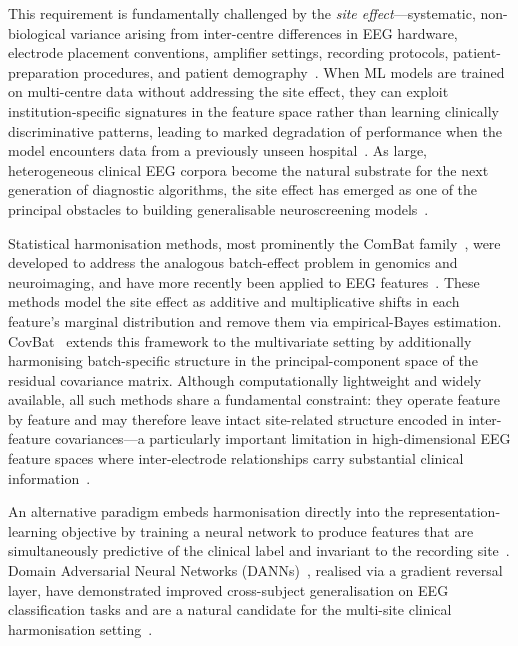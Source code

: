 \documentclass[preprint,12pt]{elsarticle}
\begin{document}
This requirement is fundamentally challenged by the \emph{site
effect}---systematic, non-biological variance arising from
inter-centre differences in EEG hardware, electrode placement
conventions, amplifier settings, recording protocols, patient-
preparation procedures, and patient
demography~\cite{jaramillo2024combat,li2022harmnqeeg}.
When ML models are trained on multi-centre data without addressing
the site effect, they can exploit institution-specific signatures in
the feature space rather than learning clinically discriminative
patterns, leading to marked degradation of performance when the model
encounters data from a previously unseen
hospital~\cite{kiessner2023extended,mellot2023meeg}.
As large, heterogeneous clinical EEG corpora become the natural
substrate for the next generation of diagnostic algorithms, the site
effect has emerged as one of the principal obstacles to building
generalisable neuroscreening models~\cite{dong2025normative,
mushtaq2025eeg}.

Statistical harmonisation methods, most prominently the ComBat
family~\cite{johnson2007adjusting,fortin2017harmonization,
fortin2018cortical}, were developed to address the analogous
batch-effect problem in genomics and neuroimaging, and have more
recently been applied to EEG
features~\cite{jaramillo2024combat,li2022harmnqeeg}.
These methods model the site effect as additive and multiplicative
shifts in each feature's marginal distribution and remove them via
empirical-Bayes estimation.
CovBat~\cite{hu2023image} extends this framework to the multivariate
setting by additionally harmonising batch-specific structure in the
principal-component space of the residual covariance matrix.
Although computationally lightweight and widely available, all such
methods share a fundamental constraint: they operate feature by
feature and may therefore leave intact site-related structure encoded
in inter-feature covariances---a particularly important limitation in
high-dimensional EEG feature spaces where inter-electrode
relationships carry substantial clinical
information~\cite{hu2023image,mellot2023meeg}.

An alternative paradigm embeds harmonisation directly into the
representation-learning objective by training a neural network to
produce features that are simultaneously predictive of the clinical
label and invariant to the recording
site~\cite{ganin2016domain,ozdenizci2020invariant}.
Domain Adversarial Neural Networks (DANNs)~\cite{ganin2016domain},
realised via a gradient reversal layer, have demonstrated improved
cross-subject generalisation on EEG classification tasks and are a
natural candidate for the multi-site clinical harmonisation
setting~\cite{bethge2022multidomain,liu2023multisource}.
\end{document}
